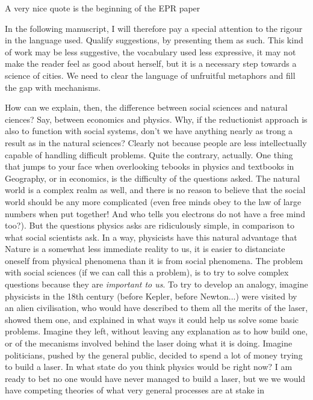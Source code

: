 A very nice quote is the beginning of the EPR paper

In the following manuscript, I will therefore pay a special attention to the
rigour in the language used. Qualify suggestions, by presenting them as such.
This kind of work may be less suggestive, the vocabulary used less expressive,
it may not make the reader feel as good about herself, but it is a necessary
step towards a science of cities. We need to clear the language of unfruitful
metaphors and fill the gap with mechanisms.

How can we explain, then, the difference between social sciences and natural
ciences? Say, between economics and physics. Why, if the reductionist approach
is also to function with social systems, don't we have anything nearly as trong
a result as in the natural sciences? Clearly not because people are less
intellectually capable of handling difficult problems. Quite the
contrary, actually. One thing that jumps to your face when overlooking tebooks
in physics and textbooks in Geography, or in economics, is the difficulty of the
questions asked. The natural world is a complex realm as well, and there is no
reason to believe that the social world should be any more complicated (even
free minds obey to the law of large numbers when put together! And who tells you
electrons do not have a free mind too?). But the questions physics asks are
ridiculously simple, in comparison to what social scientists ask. In a way,
physicists have this natural advantage that Nature is a somewhat less immediate
reality to us, it is easier to distanciate oneself from physical phenomena than
it is from social phenomena. The problem with social sciences (if we can call
this a problem), is to try to solve complex questions because they are
\emph{important to us}. To try to develop an analogy, imagine physicists in the
18th century (before Kepler, before Newton...) were visited by an alien
civilisation, who would have described to them all the merits of the laser,
showed them one, and explained in what ways it could help us solve some basic
problems. Imagine they left, without leaving any explanation as to how build
one, or of the mecanisms involved behind the laser doing what it is doing.
Imagine politicians, pushed by the general public, decided to spend a lot of
money trying to build a laser. In what state do you think physics would be right
now? I am ready to bet no one would have never managed to build a laser, but we
we would have competing theories of what very general processes are at stake in

